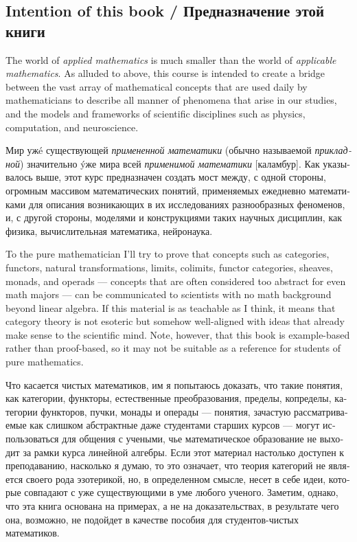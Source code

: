 \documentclass[a4paper]{book}
\theoremstyle{myth}
\begin{document}
\begin{russian}

\section{Intention of this book / Предназначение этой книги}

The world of {\em applied mathematics} is much smaller than the world of {\em applicable mathematics}. As alluded to above, this course is intended to create a bridge between the vast array of mathematical concepts that are used daily by mathematicians to describe all manner of phenomena that arise in our studies, and the models and frameworks of scientific disciplines such as physics, computation, and neuroscience.

Мир уж\'e существующей {\em примененной математики} (обычно называемой {\em прикладной}) значительно \'yже мира всей {\em применимой математики} [каламбур].%
 Как указывалось выше, этот курс предназначен создать мост между, с одной стороны, огромным массивом математических понятий, применяемых ежедневно математиками для описания возникающих в их исследованиях разнообразных феноменов, и, с другой стороны, моделями и конструкциями таких научных дисциплин, как физика, вычислительная математика, нейронаука. 

To the pure mathematician I'll try to prove that concepts such as categories, functors, natural transformations, limits, colimits, functor categories, sheaves, monads, and operads — concepts that are often considered too abstract for even math majors — can be communicated to scientists with no math background beyond linear algebra. If this material is as teachable as I think, it means that category theory is not esoteric but somehow well-aligned with ideas that already make sense to the scientific mind. Note, however, that this book is example-based rather than proof-based, so it may not be suitable as a reference for students of pure mathematics.

Что касается чистых математиков, им я попытаюсь доказать, что такие понятия, как категории, функторы, естественные преобразования, пределы, копределы, категории функторов, пучки, монады и операды — понятия, зачастую рассматриваемые как слишком абстрактные даже студентами старших курсов — могут использоваться для общения с учеными, чье математическое образование не выходит за рамки курса линейной алгебры. Если этот материал настолько доступен к преподаванию, насколько я думаю, то это означает, что теория категорий не является своего рода эзотерикой, но, в определенном смысле, несет в себе идеи, которые совпадают с уже существующими в уме любого ученого. Заметим, однако, что эта книга основана на примерах, а не на доказательствах, в результате чего она, возможно, не подойдет в качестве пособия для студентов-чистых математиков. 


\end{russian}
\end{document}
